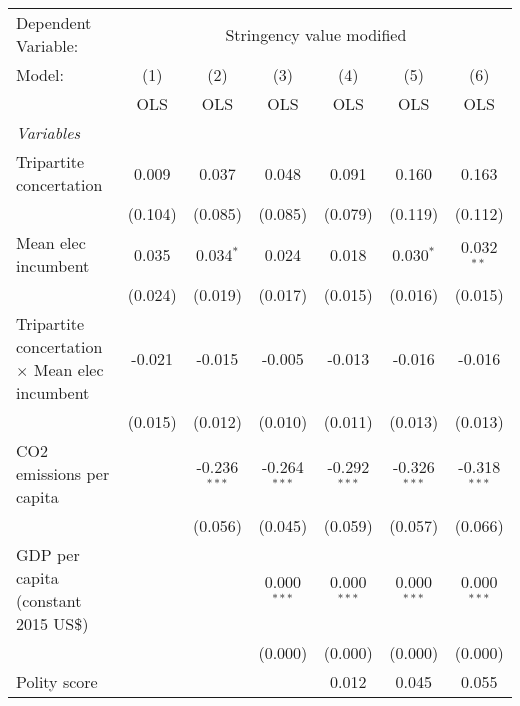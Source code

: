 
\begingroup
\centering
\begin{tabular}{lcccccc}
   \toprule
   Dependent Variable: & \multicolumn{6}{c}{Stringency value modified}\\
   Model:                                                & (1)     & (2)            & (3)            & (4)            & (5)            & (6)\\  
                                                         &  OLS    & OLS            & OLS            & OLS            & OLS            & OLS\\  
   \midrule
   \emph{Variables}\\
   Tripartite concertation                               & 0.009   & 0.037          & 0.048          & 0.091          & 0.160          & 0.163\\   
                                                         & (0.104) & (0.085)        & (0.085)        & (0.079)        & (0.119)        & (0.112)\\   
   Mean elec incumbent                                   & 0.035   & 0.034$^{*}$    & 0.024          & 0.018          & 0.030$^{*}$    & 0.032$^{**}$\\   
                                                         & (0.024) & (0.019)        & (0.017)        & (0.015)        & (0.016)        & (0.015)\\   
   Tripartite concertation $\times$ Mean elec incumbent  & -0.021  & -0.015         & -0.005         & -0.013         & -0.016         & -0.016\\   
                                                         & (0.015) & (0.012)        & (0.010)        & (0.011)        & (0.013)        & (0.013)\\   
   CO2 emissions per capita                              &         & -0.236$^{***}$ & -0.264$^{***}$ & -0.292$^{***}$ & -0.326$^{***}$ & -0.318$^{***}$\\   
                                                         &         & (0.056)        & (0.045)        & (0.059)        & (0.057)        & (0.066)\\   
   GDP per capita (constant 2015 US\$)                   &         &                & 0.000$^{***}$  & 0.000$^{***}$  & 0.000$^{***}$  & 0.000$^{***}$\\   
                                                         &         &                & (0.000)        & (0.000)        & (0.000)        & (0.000)\\   
   Polity score                                          &         &                &                & 0.012          & 0.045          & 0.055\\   

\end{tabular}
